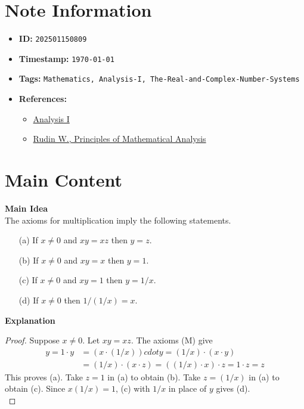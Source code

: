 \clearpage
{}
\label{202501150809}
\renewcommand{\notetitle}{Implications of the Multiplication Axioms}

\section*{Note Information}
\begin{itemize}
  \item \textbf{ID:} \texttt{202501150809}
  \item \textbf{Timestamp:} \texttt{\today \ \currenttime}
  \item \textbf{Tags:} \texttt{Mathematics, Analysis-I, The-Real-and-Complex-Number-Systems}
  \item \textbf{References:}
    \begin{itemize}
      \item \href{https://ocw.mit.edu/courses/18-100b-analysis-i-fall-2010/}{Analysis I}
      \item \href{/home/garrett/Personal/References/Mathematics/Analysis-I/Rudin.pdf}{Rudin W., Principles of Mathematical Analysis}
    \end{itemize}
\end{itemize}


\section*{Main Content}
\textbf{Main Idea}\\
The axioms for multiplication imply the following statements.
\begin{itemize}
  \item[(a)] If $x \neq 0$ and $xy = xz$ then $y = z$.
  \item[(b)] If $x \neq 0$ and $xy = x$ then $y = 1$.
  \item[(c)] If $x \neq 0$ and $xy = 1$ then $y = 1/x$.
  \item[(d)] If $x \neq 0$ then $1/(1/x) = x$.\\
\end{itemize}

\textbf{Explanation}\\
\begin{proof}
  Suppose $x \neq 0$. Let $xy = xz$. The axioms (M) give
  \begin{align*}
    y = 1 \cdot y &= (x \cdot (1/x)) cdot y = (1/x) \cdot (x \cdot y)\\
                  &= (1/x) \cdot (x \cdot z) = ((1/x) \cdot x) \cdot z = 1 \cdot z = z
  \end{align*}
  This proves (a). Take $z = 1$ in (a) to obtain (b). Take $z = (1/x)$ in (a) to obtain (c). Since $x(1/x) = 1$, (c) with $1/x$ in place of $y$ gives (d).\\
\end{proof}


